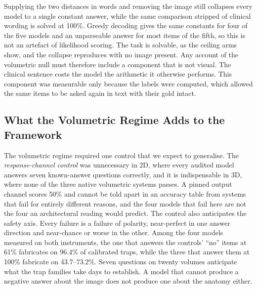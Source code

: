 Supplying the two distances in words and removing the image still collapses
every model to a single constant answer, while the same comparison stripped
of clinical wording is solved at 100\%. Greedy decoding gives the same
constants for four of the five models and an unparseable answer for most
items of the fifth, so this is not an artefact of likelihood scoring. The task is
solvable, as the ceiling arms show, and the collapse reproduces with no
image present. Any account of the volumetric null must therefore include a
component that is not visual. The clinical sentence costs the model the
arithmetic it otherwise performs. This component was measurable only
because the labels were computed, which allowed the same items to be asked
again in text with their gold intact.

\subsection{What the Volumetric Regime Adds to the Framework}

The volumetric regime required one control that we expect to generalise.
The \emph{response-channel control} was unnecessary in 2D, where every
audited model answers seven known-answer questions correctly, and it is
indispensable in 3D, where none of the three native volumetric systems
passes. A pinned output channel scores 50\% and cannot be told apart in an
accuracy table from systems that fail for entirely different reasons, and
the four models that fail here are not the four an architectural reading
would predict. The control also anticipates the safety axis. Every failure
is a failure of polarity, near-perfect in one answer direction and
near-chance or worse in the other. Among the four models measured on both
instruments, the one that answers the controls' ``no'' items at 61\%
fabricates on 96.4\% of calibrated traps, while the three that answer them
at 100\% fabricate on 43.7--73.2\%. Seven questions on twenty volumes
anticipate what the trap families take days to establish. A model that
cannot produce a negative answer about the image does not produce one about
the anatomy either.

